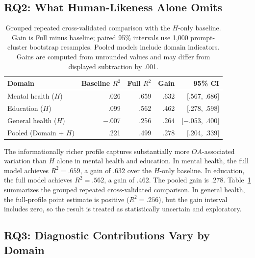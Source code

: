 \documentclass[manuscript,review,anonymous]{acmart}
\begin{document}
\subsection{RQ2: What Human-Likeness Alone Omits}

\begin{table}[t]
\centering
\caption{Grouped repeated cross-validated comparison with the $H$-only baseline. Gain is Full minus baseline; paired 95\% intervals use 1,000 prompt-cluster bootstrap resamples. Pooled models include domain indicators. Gains are computed from unrounded values and may differ from displayed subtraction by .001.}
\label{tab:cv}
\begin{tabular}{lrrrr}
\toprule
Domain & Baseline $R^2$ & Full $R^2$ & Gain & 95\% CI\\
\midrule
Mental health ($H$) & .026 & .659 & .632 & [.567, .686]\\
Education ($H$) & .099 & .562 & .462 & [.278, .598]\\
General health ($H$) & $-$.007 & .256 & .264 & [$-$.053, .400]\\
Pooled (Domain + $H$) & .221 & .499 & .278 & [.204, .339]\\
\bottomrule
\end{tabular}
\end{table}

The informationally richer profile captures substantially more $OA$-associated variation than $H$ alone in mental health and education. In mental health, the full model achieves $R^2=.659$, a gain of .632 over the $H$-only baseline. In education, the full model achieves $R^2=.562$, a gain of .462. The pooled gain is .278. Table~\ref{tab:cv} summarizes the grouped repeated cross-validated comparison. In general health, the full-profile point estimate is positive ($R^2=.256$), but the gain interval includes zero, so the result is treated as statistically uncertain and exploratory.

\subsection{RQ3: Diagnostic Contributions Vary by Domain}
\end{document}
